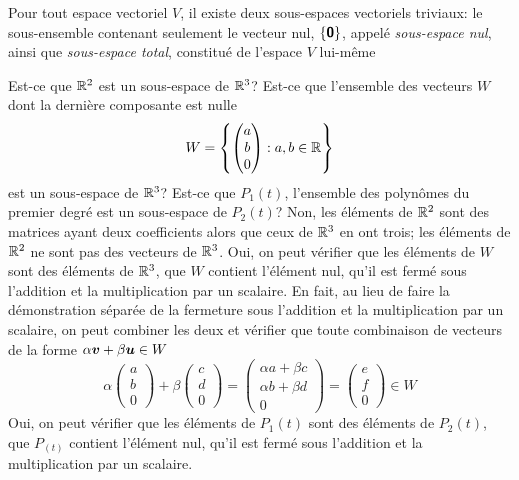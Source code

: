 Pour tout espace vectoriel $V$, il existe deux sous-espaces vectoriels triviaux: le sous-ensemble contenant seulement le vecteur nul, $\{\mbox{\textsf{\textbf{{0}}}}\}$, appelé \textit{sous-espace nul}, ainsi que \textit{sous-espace total}, constitué de l'espace $V$ lui-même

\begin{exemple}
 Est-ce que $\mathbb{R}^2$ est un sous-espace de $\mathbb{R}^3$?
 Est-ce que l'ensemble des vecteurs $W$ dont la dernière composante est nulle
\[
W = \left\{ \begin{pmatrix}
a\\
b\\
0
\end{pmatrix}: a, b \in \mathbb{R}\right\}
\]
est un sous-espace de $\mathbb{R}^3$?
 Est-ce que $P_1(t)$, l'ensemble des polynômes du premier degré est un sous-espace de $P_2(t)$?
\solution
{} Non, les éléments de $\mathbb{R}^2$ sont des matrices ayant deux coefficients alors
que ceux de $\mathbb{R}^3$ en ont trois; les éléments de $\mathbb{R}^2$ ne sont pas des vecteurs de $\mathbb{R}^3$.
 Oui, on peut vérifier que les éléments de $W$ sont des éléments de $\mathbb{R}^3$, que $W$ contient
l'élément nul, qu'il est fermé sous l'addition et la multiplication par un scalaire.  En fait, au lieu de faire la démonstration
séparée de la fermeture sous l'addition et la multiplication par un scalaire, on peut combiner les deux et vérifier
que toute combinaison de vecteurs de la forme $\alpha\boldsymbol{v} + \beta\boldsymbol{u} \in W$
\[
\alpha  \begin{pmatrix}
a\\
b\\
0
\end{pmatrix}
+ \beta  \begin{pmatrix}
c\\
d\\
0
\end{pmatrix}
=
 \begin{pmatrix}
\alpha a + \beta c\\
\alpha b + \beta d\\
0
\end{pmatrix} 
=
 \begin{pmatrix}
e\\
f\\
0
\end{pmatrix}
\in W
\]
 Oui, on peut vérifier que les éléments de $P_1(t)$ sont des éléments de $P_2(t)$, que $P_(t)$ contient
l'élément nul, qu'il est fermé sous l'addition et la multiplication par un scalaire.
\end{exemple}
